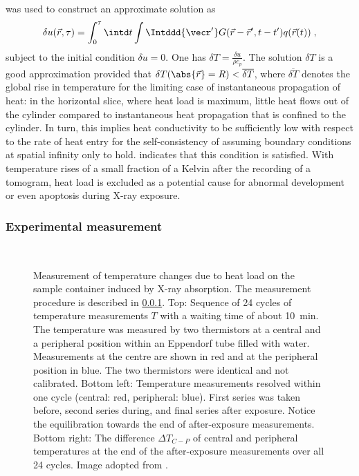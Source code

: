 \documentclass[
twoside,
openright,
titlepage,
numbers=noenddot,
headinclude,
fleqn,
a4paper,
footinclude=true,
cleardoublepage=empty,
abstractoff,
BCOR=5mm,
paper=a4,
fontsize=11pt,
british,ngerman,american,
]{scrreprt}
\begin{document}
was used to construct an approximate solution as
\begin{equation}
  \label{eq:sol-approx}
  \delta u(\vec{r},\tau) =
  \int_0^\tau\intd t\int\Intddd{\vecr'}G(\vec{r}-\vec{r}',t-t')
  q(\vec{r}(t))\;,
\end{equation}
subject to the initial condition $\delta u=0$.  One has $\delta
T=\frac{\delta u}{\rho c_p}$.  The solution $\delta T$ is a good
approximation provided that $\delta T( \abs{ \vec{r} } =R ) <
\overline{ \delta T}$, where $\overline{ \delta T}$ denotes the global
rise in temperature for the limiting case of instantaneous propagation
of heat: in the horizontal slice, where heat load is maximum, little
heat flows out of the cylinder compared to instantaneous heat
propagation that is confined to the cylinder.  In turn, this implies
heat conductivity to be sufficiently low with respect to the rate of
heat entry for the self-consistency of assuming boundary conditions at
spatial infinity only to hold.   indicates that
this condition is satisfied.  With temperature rises of a small
fraction of a Kelvin after the recording of a tomogram, heat load is
excluded as a potential cause for abnormal development or even
apoptosis during X-ray exposure.


\subsubsection{Experimental measurement}
\label{sec:bio-dose-heat-exp}

\begin{figure}
  \centering
\\
  \caption[ Measurement of temperature changes due to heat load on the
  sample container induced by X-ray absorption.]{%
    Measurement of temperature changes due to heat load on the sample
    container induced by X-ray absorption. The measurement procedure
    is described in \cref{sec:bio-dose-heat-exp}.  Top: Sequence of 24
    cycles of temperature measurements $T$ with a waiting time of
    about \SI{10}{min}.  The temperature was measured by two
    thermistors at a central and a peripheral position within an
    Eppendorf tube filled with water.  Measurements at the centre are
    shown in red and at the peripheral position in blue.  The two
    thermistors were identical and not calibrated.  Bottom left:
    Temperature measurements resolved within one cycle (central: red,
    peripheral: blue).  First series was taken before, second series
    during, and final series after exposure.  Notice the equilibration
    towards the end of after-exposure measurements.  Bottom right: The
    difference $\Delta T_{C-P}$ of central and peripheral temperatures
    at the end of the after-exposure measurements over all 24 cycles.
    Image adopted from \cite{Moosmann2013nature}.}
  \label{fig:temp-exp}
\end{figure}
\end{document}
